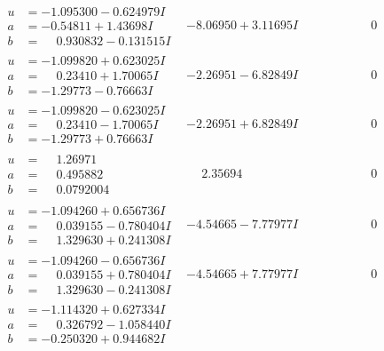 \documentclass[1p]{elsarticle_modified}
\theoremstyle{definition}
\begin{document}
$$\begin{array}{c|c|c}
\begin{aligned}
u &= -1.095300 - 0.624979 I \\
a &= -0.54811 + 1.43698 I \\
b &= \phantom{-}0.930832 - 0.131515 I\end{aligned}
 & -8.06950 + 3.11695 I & \phantom{-0.000000 } 0 \\ \hline\begin{aligned}
u &= -1.099820 + 0.623025 I \\
a &= \phantom{-}0.23410 + 1.70065 I \\
b &= -1.29773 - 0.76663 I\end{aligned}
 & -2.26951 - 6.82849 I & \phantom{-0.000000 } 0 \\ \hline\begin{aligned}
u &= -1.099820 - 0.623025 I \\
a &= \phantom{-}0.23410 - 1.70065 I \\
b &= -1.29773 + 0.76663 I\end{aligned}
 & -2.26951 + 6.82849 I & \phantom{-0.000000 } 0 \\ \hline\begin{aligned}
u &= \phantom{-}1.26971\phantom{ +0.000000I} \\
a &= \phantom{-}0.495882\phantom{ +0.000000I} \\
b &= \phantom{-}0.0792004\phantom{ +0.000000I}\end{aligned}
 & \phantom{-}2.35694\phantom{ +0.000000I} & \phantom{-0.000000 } 0 \\ \hline\begin{aligned}
u &= -1.094260 + 0.656736 I \\
a &= \phantom{-}0.039155 - 0.780404 I \\
b &= \phantom{-}1.329630 + 0.241308 I\end{aligned}
 & -4.54665 - 7.77977 I & \phantom{-0.000000 } 0 \\ \hline\begin{aligned}
u &= -1.094260 - 0.656736 I \\
a &= \phantom{-}0.039155 + 0.780404 I \\
b &= \phantom{-}1.329630 - 0.241308 I\end{aligned}
 & -4.54665 + 7.77977 I & \phantom{-0.000000 } 0 \\ \hline\begin{aligned}
u &= -1.114320 + 0.627334 I \\
a &= \phantom{-}0.326792 - 1.058440 I \\
b &= -0.250320 + 0.944682 I\end{aligned}

\end{array}$$
\end{document}
